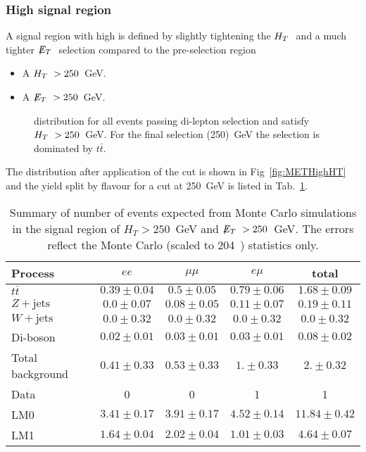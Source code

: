 \subsubsection{High \MET signal region}

A signal region with high \MET is defined by slightly tightening the $H_T~$ 
and a much tighter $\displaystyle{\not} E_T~$ selection compared to the pre-selection region
\begin{itemize}
\item A $H_T~>250$~GeV.
\item A $\displaystyle{\not} E_T~>250$~GeV.
\end{itemize}

\begin{figure}[hbtp]
  \hfill
  \caption{\MET distribution for all events passing di-lepton selection and satisfy $H_T~> 250$~GeV. For the final \MET selection (250)~GeV the selection is dominated by $t\bar{t}$.}
\end{figure}

The \MET distribution after application of the \HT
cut is shown in Fig~\ref{fig:METHighHT} and
the yield split by flavour for a cut at 250~GeV is listed in Tab.~\ref{tab:HighMET}.

\begin{table}[htb]
\begin{center}
\caption{\label{tab:HighMET}\protect Summary of number of events expected from Monte Carlo simulations in 
the signal region of $H_T> 250$~GeV and $\displaystyle{\not} E_T~> 250$~GeV. The errors reflect the Monte Carlo (scaled
    to 204~\pbi) statistics only.}
\begin{tabular}{l|ccc|c}
\hline
Process           & $ee$       & $\mu\mu$     & $e\mu$   & total   \\
\hline\hline
$t\bar{t}$       &$0.39 \pm 0.04$&$0.5 \pm 0.05$&$0.79 \pm 0.06$&$1.68 \pm 0.09$\\
$Z+\textrm{jets}$  &$0.0 \pm 0.07$&$0.08 \pm 0.05$&$0.11 \pm 0.07$&$0.19 \pm 0.11$\\
$W+\textrm{jets}$  &$0.0 \pm 0.32$&$0.0 \pm 0.32$&$0.0 \pm 0.32$&$0.0 \pm 0.32$\\
Di-boson          & $0.02 \pm 0.01$&$0.03 \pm 0.01$&$0.03 \pm 0.01$ & $0.08\pm 0.02$ \\
\hline
Total background  &$0.41 \pm 0.33$&$0.53 \pm 0.33$&$1. \pm 0.33$&$2. \pm 0.32$\\
\hline
Data  & 0 & 0 & 1 & 1 \\
\hline\hline
LM0               &$3.41 \pm 0.17$&$3.91 \pm 0.17$&$4.52 \pm 0.14$&$11.84 \pm 0.42$ \\
LM1               &$1.64 \pm 0.04$&$2.02 \pm 0.04$&$1.01 \pm 0.03$&$4.64 \pm 0.07$ \\
\hline
\end{tabular}
\end{center}
\end{table}
